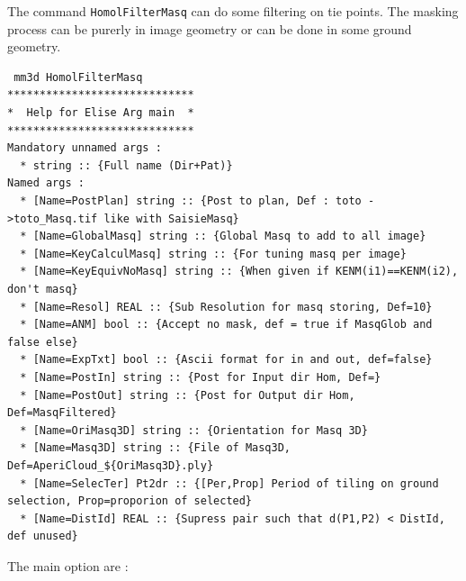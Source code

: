 The command {\tt HomolFilterMasq} can do some filtering on tie points. The masking
process can be purerly in image geometry or can be done in some ground geometry.

\begin{verbatim}
 mm3d HomolFilterMasq
*****************************
*  Help for Elise Arg main  *
*****************************
Mandatory unnamed args : 
  * string :: {Full name (Dir+Pat)}
Named args : 
  * [Name=PostPlan] string :: {Post to plan, Def : toto ->toto_Masq.tif like with SaisieMasq}
  * [Name=GlobalMasq] string :: {Global Masq to add to all image}
  * [Name=KeyCalculMasq] string :: {For tuning masq per image}
  * [Name=KeyEquivNoMasq] string :: {When given if KENM(i1)==KENM(i2), don't masq}
  * [Name=Resol] REAL :: {Sub Resolution for masq storing, Def=10}
  * [Name=ANM] bool :: {Accept no mask, def = true if MasqGlob and false else}
  * [Name=ExpTxt] bool :: {Ascii format for in and out, def=false}
  * [Name=PostIn] string :: {Post for Input dir Hom, Def=}
  * [Name=PostOut] string :: {Post for Output dir Hom, Def=MasqFiltered}
  * [Name=OriMasq3D] string :: {Orientation for Masq 3D}
  * [Name=Masq3D] string :: {File of Masq3D, Def=AperiCloud_${OriMasq3D}.ply}
  * [Name=SelecTer] Pt2dr :: {[Per,Prop] Period of tiling on ground selection, Prop=proporion of selected}
  * [Name=DistId] REAL :: {Supress pair such that d(P1,P2) < DistId, def unused}
\end{verbatim}

The main option are :

